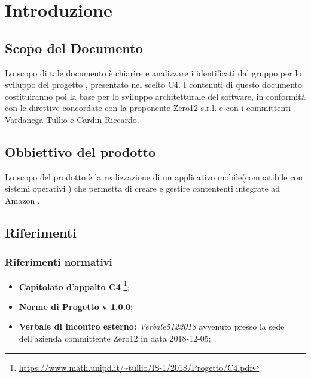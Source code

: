 \chapter{Introduzione}

\section{Scopo del Documento}
Lo scopo di tale documento è chiarire e analizzare i  identificati dal gruppo  per lo sviluppo del progetto , presentato nel  scelto C4.
I contenuti di questo documento costituiranno poi la base per lo sviluppo architetturale del software, in conformità con le direttive concordate con la proponente Zero12 s.r.l. e con i committenti Vardanega Tullio e Cardin Riccardo.

\section{Obbiettivo del prodotto}
Lo scopo del prodotto è la realizzazione di un applicativo mobile(compatibile con sistemi operativi ) che permetta di creare e gestire  contententi  integrate ad Amazon .

\section{Riferimenti}

\subsection{Riferimenti normativi}
\begin{itemize}
	
	\item \textbf{Capitolato d'appalto C4} \footnote{\url{https://www.math.unipd.it/~tullio/IS-1/2018/Progetto/C4.pdf}};
	\item \textbf{Norme di Progetto v 1.0.0};
	\item \textbf{Verbale di incontro esterno:} \textit{Verbale5122018} avvenuto presso la sede dell'azienda committente Zero12 in data 2018-12-05;

\end{itemize}

